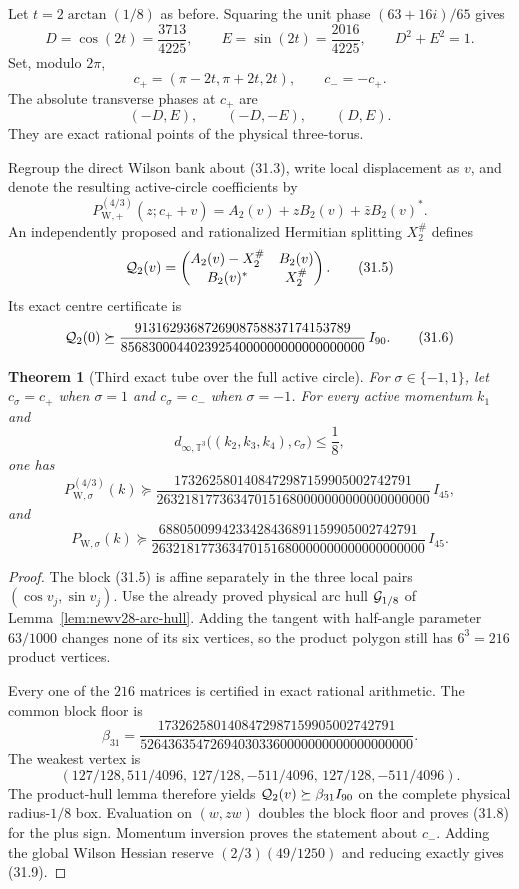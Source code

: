 \documentclass[11pt,oneside]{article}
\newtheorem{theorem}{Theorem}[section]
\theoremstyle{definition}
\theoremstyle{remark}
\begin{document}
Let \(t=2\arctan(1/8)\) as before.  Squaring the unit phase
\((63+16i)/65\) gives
\[
 D=\cos(2t)=\frac{3713}{4225},\qquad
 E=\sin(2t)=\frac{2016}{4225},\qquad D^2+E^2=1.         \tag{31.1}
\]
Set, modulo \(2\pi\),
\[
 c_+=(\pi-2t,\pi+2t,2t),\qquad c_-=-c_+.               \tag{31.2}
\]
The absolute transverse phases at \(c_+\) are
\[
 (-D,E),\qquad(-D,-E),\qquad(D,E).                     \tag{31.3}
\]
They are exact rational points of the physical three-torus.

Regroup the direct Wilson bank about (31.3), write local displacement
as \(v\), and denote the resulting active-circle coefficients by
\[
 P_{\mathrm W,+}^{(4/3)}(z;c_++v)
 =A_2(v)+zB_2(v)+\bar zB_2(v)^*.                       \tag{31.4}
\]
An independently proposed and rationalized Hermitian splitting
\(X_2^\#\) defines
\[
 {\cal Q}_2(v)=
 \begin{pmatrix}
 A_2(v)-X_2^\#&B_2(v)\\
 B_2(v)^*&X_2^\#
 \end{pmatrix}.                                        \tag{31.5}
\]
Its exact centre certificate is
\[
 {\cal Q}_2(0)\succeq
 \frac{9131629368726908758837174153789}
 {85683000440239254000000000000000000}\,I_{90}.        \tag{31.6}
\]

\begin{theorem}[Third exact tube over the full active circle]
\label{thm:newv31-third-tube}
For \(\sigma\in\{-1,1\}\), let \(c_\sigma=c_+\) when
\(\sigma=1\) and \(c_\sigma=c_-\) when \(\sigma=-1\).
For every active momentum \(k_1\) and
\[
 d_{\infty,\mathbb T^3}
 \bigl((k_2,k_3,k_4),c_\sigma\bigr)\le\frac18,          \tag{31.7}
\]
one has
\[
 P_{\mathrm W,\sigma}^{(4/3)}(k)\succeq
 \frac{1732625801408472987159905002742791}
 {263218177363470151680000000000000000000}\,I_{45},    \tag{31.8}
\]
and
\[
 P_{\mathrm W,\sigma}(k)\succeq
 \frac{6880500994233428436891159905002742791}
 {263218177363470151680000000000000000000}\,I_{45}.    \tag{31.9}
\]
\end{theorem}

\begin{proof}
The block (31.5) is affine separately in the three local pairs
\((\cos v_j,\sin v_j)\).  Use the already proved physical arc hull
\({\cal G}_{1/8}\) of Lemma~\ref{lem:newv28-arc-hull}.  Adding the
tangent with half-angle parameter \(63/1000\) changes none of its
six vertices, so the product polygon still has \(6^3=216\) product
vertices.

Every one of the \(216\) matrices is certified in exact rational
arithmetic.  The common block floor is
\[
 \beta_{31}=
 \frac{1732625801408472987159905002742791}
 {526436354726940303360000000000000000000}.             \tag{31.10}
\]
The weakest vertex is
\[
 (127/128,511/4096,\,
  127/128,-511/4096,\,
  127/128,-511/4096).                                  \tag{31.11}
\]
The product-hull lemma therefore yields
\({\cal Q}_2(v)\succeq\beta_{31}I_{90}\) on the complete
physical radius-\(1/8\) box.  Evaluation on
\((w,zw)\) doubles the block floor and proves (31.8) for the plus
sign.  Momentum inversion proves the statement about \(c_-\).
Adding the global Wilson Hessian reserve
\((2/3)(49/1250)\) and reducing exactly gives (31.9).
\end{proof}
\end{document}
